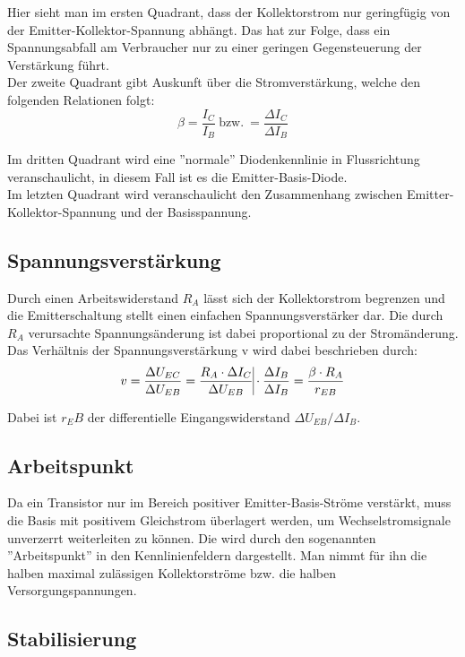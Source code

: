 \documentclass{article}
\begin{document}
Hier sieht man im ersten Quadrant, dass der Kollektorstrom nur geringfügig von der Emitter-Kollektor-Spannung abhängt. Das hat zur Folge, dass ein Spannungsabfall am Verbraucher nur zu einer geringen Gegensteuerung der Verstärkung führt.\\
Der zweite Quadrant gibt Auskunft über die Stromverstärkung, welche den folgenden Relationen folgt:
\begin{equation}
\beta =\frac{I_C}{I_B}\ \text{bzw.}\ =\frac{\Delta I_C}{\Delta I_B}
\end{equation}

Im dritten Quadrant wird eine ''normale'' Diodenkennlinie in Flussrichtung veranschaulicht, in diesem Fall ist es die Emitter-Basis-Diode.\\

Im letzten Quadrant wird veranschaulicht den Zusammenhang zwischen Emitter-Kollektor-Spannung und der Basisspannung.

\subsection{Spannungsverstärkung}
Durch einen Arbeitswiderstand \(R_A\) lässt sich der Kollektorstrom begrenzen und die Emitterschaltung stellt einen einfachen Spannungsverstärker dar. Die durch \(R_A\) verursachte Spannungsänderung ist dabei proportional zu der Stromänderung.
Das Verhältnis der Spannungsverstärkung v wird dabei beschrieben durch:
\begin{equation}
v=\frac{\Delta U_{EC}}{\Delta U_{EB}}=\frac{R_A \cdot \Delta I_C}{\Delta U_{EB}} \vline \cdot\frac{\Delta I_B}{\Delta I_B} =\frac{\beta \cdot R_A}{r_{EB}}
\end{equation} 

Dabei ist \(r_EB\) der differentielle Eingangswiderstand \(\Delta U_{EB}/\Delta I_B\).

\subsection{Arbeitspunkt}
Da ein Transistor nur im Bereich positiver Emitter-Basis-Ströme verstärkt, muss die Basis mit positivem Gleichstrom überlagert werden, um Wechselstromsignale unverzerrt weiterleiten zu können. Die wird durch den sogenannten ''Arbeitspunkt'' in den Kennlinienfeldern dargestellt. Man nimmt für ihn die halben maximal zulässigen Kollektorströme bzw. die halben Versorgungspannungen.

\subsection{Stabilisierung}
\end{document}

